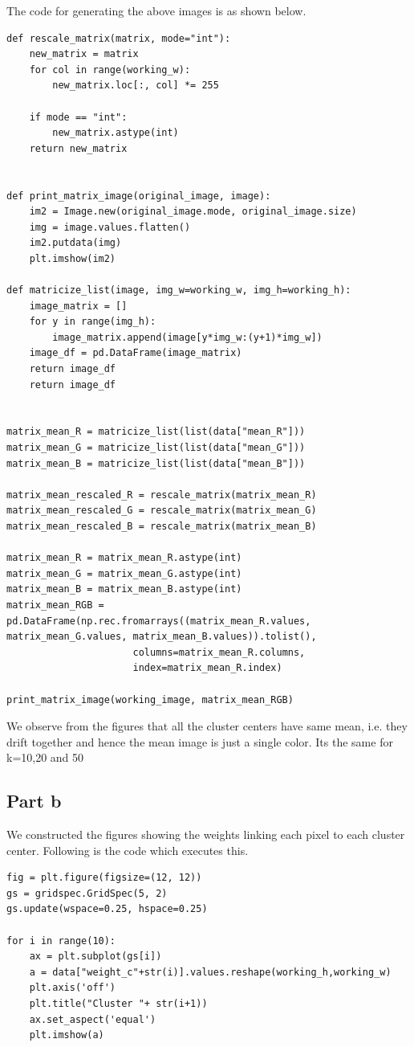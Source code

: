 \documentclass{article}      %
\begin{document}
The code for generating the above images is as shown below.

\begin{lstlisting}
def rescale_matrix(matrix, mode="int"):
    new_matrix = matrix
    for col in range(working_w):
        new_matrix.loc[:, col] *= 255
    
    if mode == "int":
        new_matrix.astype(int)
    return new_matrix
        

def print_matrix_image(original_image, image):
    im2 = Image.new(original_image.mode, original_image.size)
    img = image.values.flatten()
    im2.putdata(img)
    plt.imshow(im2)

def matricize_list(image, img_w=working_w, img_h=working_h):
    image_matrix = []
    for y in range(img_h):
        image_matrix.append(image[y*img_w:(y+1)*img_w])
    image_df = pd.DataFrame(image_matrix)
    return image_df
    return image_df


matrix_mean_R = matricize_list(list(data["mean_R"]))
matrix_mean_G = matricize_list(list(data["mean_G"]))
matrix_mean_B = matricize_list(list(data["mean_B"]))

matrix_mean_rescaled_R = rescale_matrix(matrix_mean_R)
matrix_mean_rescaled_G = rescale_matrix(matrix_mean_G)
matrix_mean_rescaled_B = rescale_matrix(matrix_mean_B)

matrix_mean_R = matrix_mean_R.astype(int)
matrix_mean_G = matrix_mean_G.astype(int)
matrix_mean_B = matrix_mean_B.astype(int)
matrix_mean_RGB = pd.DataFrame(np.rec.fromarrays((matrix_mean_R.values, matrix_mean_G.values, matrix_mean_B.values)).tolist(),
                      columns=matrix_mean_R.columns,
                      index=matrix_mean_R.index)

print_matrix_image(working_image, matrix_mean_RGB)
\end{lstlisting}

We observe from the figures that all the cluster centers have same mean, i.e. they drift together and hence the mean image is just a single color. Its the same for k=10,20 and 50

\subsection{Part b}

We constructed the figures showing the weights linking each pixel to each cluster center. Following is the code which executes this.

\begin{lstlisting}
fig = plt.figure(figsize=(12, 12))
gs = gridspec.GridSpec(5, 2)
gs.update(wspace=0.25, hspace=0.25)

for i in range(10):
    ax = plt.subplot(gs[i])
    a = data["weight_c"+str(i)].values.reshape(working_h,working_w)
    plt.axis('off')
    plt.title("Cluster "+ str(i+1))
    ax.set_aspect('equal')
    plt.imshow(a)
\end{lstlisting}
\end{document}
